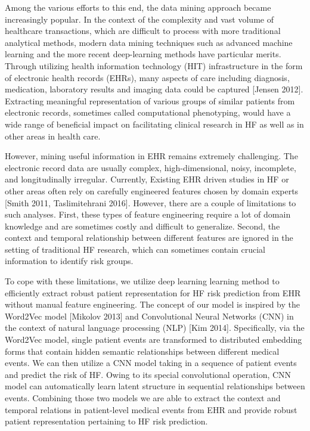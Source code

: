 \documentclass[11pt]{article}
\begin{document}
	Among the various efforts to this end, the data mining approach became increasingly popular. In the context of the complexity and vast volume of healthcare transactions, which are difficult to process with more traditional analytical methods, modern data mining techniques such as advanced machine learning and the more recent deep-learning methods have particular merits. Through utilizing health information technology (HIT) infrastructure in the form of electronic health records (EHRs), many aspects of care including diagnosis, medication, laboratory results and imaging data could be captured [Jensen 2012].  Extracting meaningful representation of various groups of similar patients from electronic records, sometimes called computational phenotyping, would have a wide range of beneficial impact on facilitating clinical research in HF as well as in other areas in health care.
	
	However, mining useful information in EHR remains extremely challenging. The electronic record data are usually complex, high-dimensional, noisy, incomplete, and longitudinally irregular. Currently, Existing EHR driven studies in HF or other areas often rely on carefully engineered features chosen by domain experts [Smith 2011, Taslimitehrani 2016].  However, there are a couple of limitations to such analyses. First, these types of feature engineering require a lot of domain knowledge and are sometimes costly and difficult to generalize. Second, the context and temporal relationship between different features are ignored in the setting of traditional HF research, which can sometimes contain crucial information to identify risk groups.
	
	To cope with these limitations, we utilize deep learning learning method to efficiently extract robust patient representation for HF risk prediction from EHR without manual feature engineering. The concept of our model is inspired by the Word2Vec model [Mikolov 2013] and Convolutional Neural Networks (CNN) in the context of natural language processing (NLP) [Kim 2014]. Specifically, via the Word2Vec model, single patient events are transformed to distributed embedding forms that contain hidden semantic relationships between different medical events. We can then utilize a CNN model taking in a sequence of patient events and predict the risk of HF. Owing to its special convolutional operation, CNN model can automatically learn latent structure in sequential relationships between events. Combining those two models we are able to extract the context and temporal relations in patient-level medical events from EHR and provide robust patient representation pertaining to HF risk prediction. 
	
\end{document}
